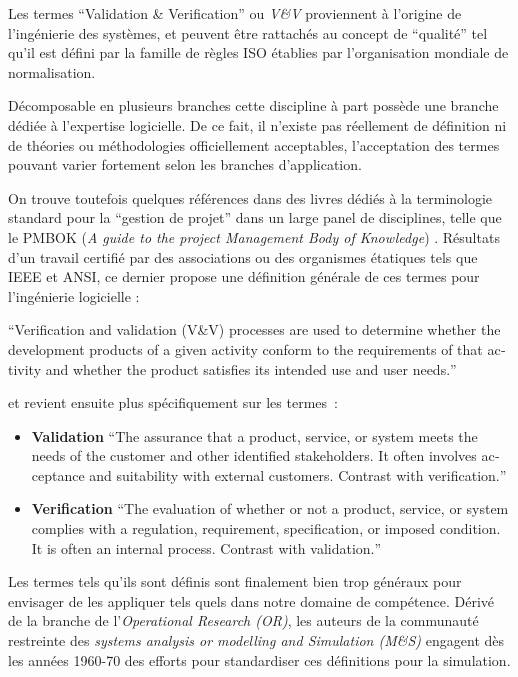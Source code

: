 Les termes \foreignquote{english}{Validation \& Verification} ou \textit{V\&V} proviennent à l'origine de l'ingénierie des systèmes, et peuvent être rattachés au concept de \enquote{qualité} tel qu'il est défini par la famille de règles ISO établies par l'organisation mondiale de normalisation.

Décomposable en plusieurs branches cette discipline à part possède une branche dédiée à l'expertise logicielle. De ce fait, il n'existe pas réellement de définition ni de théories ou méthodologies officiellement acceptables, l'acceptation des termes pouvant varier fortement selon les branches d'application.

On trouve toutefois quelques références dans des livres dédiés à la terminologie standard pour la \enquote{gestion de projet} dans un large panel de disciplines, telle que le PMBOK (\textit{A guide to the project Management Body of Knowledge}) \autocite{PMBOK2013}. Résultats d'un travail certifié par des associations ou des organismes étatiques tels que IEEE et ANSI, ce dernier propose une définition générale de ces termes pour l'ingénierie logicielle :

\foreignquote{english}{Verification and validation (V\&V) processes are used to determine whether the development products of a given activity conform to the requirements of that activity and whether the product satisfies its intended use and user needs.}

et revient ensuite plus spécifiquement sur les termes :

\begin{itemize}
\item \textbf{Validation} \foreignquote{english}{The assurance that a product, service, or system meets the needs of the customer and other identified stakeholders. It often involves acceptance and suitability with external customers. Contrast with verification.}
\item \textbf{Verification} \foreignquote{english}{The evaluation of whether or not a product, service, or system complies with a regulation, requirement, specification, or imposed condition. It is often an internal process. Contrast with validation.}
\end{itemize}

Les termes tels qu'ils sont définis sont finalement bien trop généraux pour envisager de les appliquer tels quels dans notre domaine de compétence. Dérivé de la branche de l'\textit{Operational Research (OR)}, les auteurs de la communauté restreinte des \textit{systems analysis or modelling and Simulation (M\&S) } engagent dès les années 1960-70 des efforts pour standardiser ces définitions pour la simulation.


